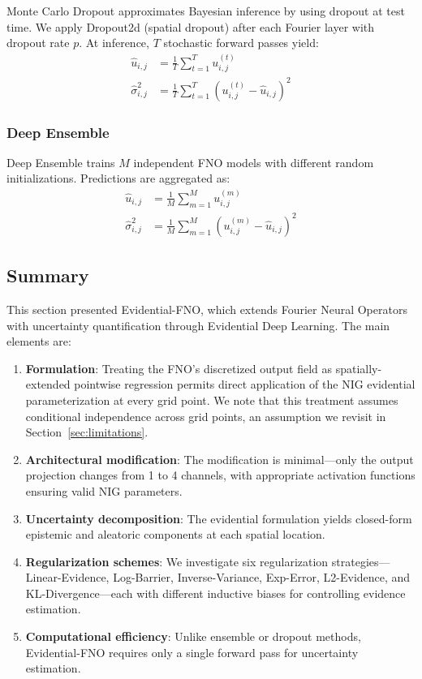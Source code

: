 Monte Carlo Dropout \cite{gal2016dropout} approximates Bayesian inference by using dropout at test time. We apply
Dropout2d (spatial dropout) \cite{tompson2015efficient} after each Fourier layer with dropout rate $p$. At inference, $T$ stochastic forward passes yield:
\begin{align}
    \hat{u}_{i,j} &= \frac{1}{T}\sum_{t=1}^{T} u^{(t)}_{i,j} \\
    \hat{\sigma}^2_{i,j} &= \frac{1}{T}\sum_{t=1}^{T} (u^{(t)}_{i,j} - \hat{u}_{i,j})^2
\end{align}

\subsubsection{Deep Ensemble}

Deep Ensemble trains $M$ independent FNO models with different random initializations. Predictions are 
aggregated as:
\begin{align}
    \hat{u}_{i,j} &= \frac{1}{M}\sum_{m=1}^{M} u^{(m)}_{i,j} \\
    \hat{\sigma}^2_{i,j} &= \frac{1}{M}\sum_{m=1}^{M} (u^{(m)}_{i,j} - \hat{u}_{i,j})^2
\end{align}

\subsection{Summary}

This section presented Evidential-FNO, which extends Fourier Neural Operators with uncertainty
quantification through Evidential Deep Learning. The main elements are:

\begin{enumerate}
    \item \textbf{Formulation}: Treating the FNO's discretized output field as spatially-extended pointwise regression permits direct application of the NIG evidential parameterization at every grid point. We note that this treatment assumes conditional independence across grid points, an assumption we revisit in Section~\ref{sec:limitations}.

    \item \textbf{Architectural modification}: The modification is minimal---only the output projection changes from 1 to 4 channels, with appropriate activation functions ensuring valid NIG parameters.

    \item \textbf{Uncertainty decomposition}: The evidential formulation yields closed-form epistemic and aleatoric components at each spatial location.

    \item \textbf{Regularization schemes}: We investigate six regularization strategies---Linear-Evidence, Log-Barrier, Inverse-Variance, Exp-Error, L2-Evidence, and KL-Divergence---each with different inductive biases for controlling evidence estimation.

    \item \textbf{Computational efficiency}: Unlike ensemble or dropout methods, Evidential-FNO requires only a single forward pass for uncertainty estimation.
\end{enumerate}